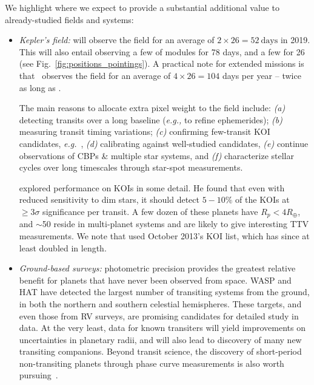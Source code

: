 We highlight where we expect \tess to provide a substantial additional value to already-studied fields and systems:
\begin{itemize}
	\item \textit{Kepler's field:}
	\tess will observe the \kepler field for an average of $2\times26=52\ \mathrm{days}$ in 2019.
	This will also entail observing a few of \keplers modules for 78 days, and a few for 26 (see Fig.~\ref{fig:positions_pointings}).
	A practical note for extended missions is that \npole\ observes the \kepler field for an average of $4\times26=104$ days per year -- twice as long as \nhemi.
		
	The main reasons to allocate extra pixel weight to the \kepler field include:
	\textit{(a)} detecting transits over a long baseline (\textit{e.g.,} to refine ephemerides);
	\textit{(b)} measuring transit timing variations;
	\textit{(c)} confirming few-transit KOI candidates, \textit{e.g.}~\citep{wang_longP_2015,uehara_transiting_2016,foreman_mackey_longP_2016}, 
	\textit{(d)} calibrating \tess against well-studied candidates,
	\textit{(e)} continue observations of CBPs \& multiple star systems, and
	\textit{(f)} characterize stellar cycles over long timescales through star-spot measurements.
		
	\citet{sullivan_KOIs_2013} explored \tesss performance on KOIs in some detail.
	He found that even with \tesss reduced sensitivity to \keplers dim stars, it should detect $5-10\%$ of the KOIs at $\geq3\sigma$ significance per transit.
	A few dozen of these planets have $R_p<4R_\oplus$, and $\sim$50 reside in multi-planet systems and are likely to give interesting TTV measurements.
	We note that \citet{sullivan_KOIs_2013} used October 2013's KOI list, which has since at least doubled in length.
	
	\item
	\textit{Ground-based surveys:} 
	\tesss photometric precision provides the greatest relative benefit for planets that have never been observed from space.
	WASP and HAT have detected the largest number of transiting systems from the ground, in both the northern and southern celestial hemispheres.
	These targets, and even those from RV surveys, are promising candidates for detailed study in \tesss data.
	At the very least, \tess data for known transiters will yield improvements on uncertainties in planetary radii, and will also lead to discovery of many new transiting companions.
	Beyond transit science, the discovery of short-period non-transiting planets through phase curve measurements is also worth pursuing~\citep{millholland_detection_2016}.
	

\end{itemize}

